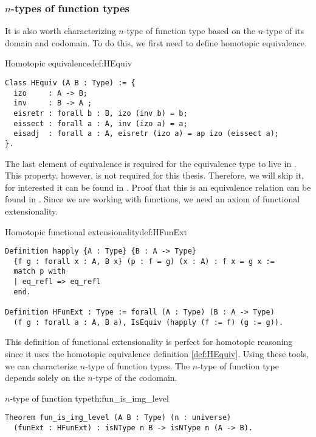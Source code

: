 \subsubsection{$n$-types of function types}
It is also worth characterizing $n$-type of function type based on the $n$-type of its domain and codomain. To do this, we first need to define homotopic equivalence. 
\begin{defi}{Homotopic equivalence}{def:HEquiv}
\begin{verbatim}
Class HEquiv (A B : Type) := {
  izo     : A -> B;
  inv     : B -> A ;
  eisretr : forall b : B, izo (inv b) = b;
  eissect : forall a : A, inv (izo a) = a;
  eisadj  : forall a : A, eisretr (izo a) = ap izo (eissect a);
}.
\end{verbatim}
\end{defi}
The last element of equivalence  is required for the equivalence type to live in . This property, however, is not required for this thesis. Therefore, we will skip it, for interested it can be found in \cite{HoTT}. Proof that this is an equivalence relation can be found in . Since we are working with functions, we need an axiom of functional extensionality.
\begin{defi}{Homotopic functional extensionality}{def:HFunExt}
\begin{verbatim}
Definition happly {A : Type} {B : A -> Type} 
  {f g : forall x : A, B x} (p : f = g) (x : A) : f x = g x :=
  match p with
  | eq_refl => eq_refl
  end.

Definition HFunExt : Type := forall (A : Type) (B : A -> Type) 
  (f g : forall a : A, B a), IsEquiv (happly (f := f) (g := g)).
\end{verbatim}
\end{defi}
This definition of functional extensionality is perfect for homotopic reasoning since it uses the homotopic equivalence definition \ref{def:HEquiv}. Using these tools, we can characterize $n$-type of function types. The $n$-type of function type depends solely on the $n$-type of the codomain. 
\begin{theo}{$n$-type of function type}{th:fun_is_img_level}
\begin{verbatim}
Theorem fun_is_img_level (A B : Type) (n : universe) 
  (funExt : HFunExt) : isNType n B -> isNType n (A -> B).
\end{verbatim}  
\end{theo}
